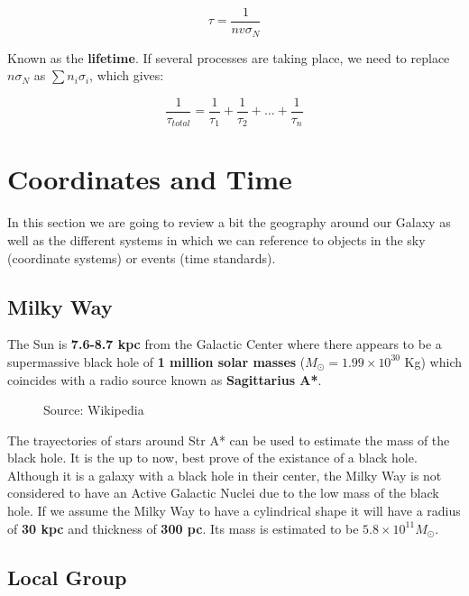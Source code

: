 \documentclass[
  letterpaper,
  DIV=11,
  numbers=noendperiod]{scrreprt}
\begin{document}
\[\tau = \frac{1}{n v\sigma_N}\]

Known as the \textbf{lifetime}. If several processes are taking place,
we need to replace \(n\sigma_N\) as \(\sum n_i\sigma_i\), which gives:

\[\frac{1}{\tau_{total}} = \frac{1}{\tau_1} + \frac{1}{\tau_2} + ... + \frac{1}{\tau_n}\]

\section*{Coordinates and Time}\label{coordinates-and-time}


In this section we are going to review a bit the geography around our
Galaxy as well as the different systems in which we can reference to
objects in the sky (coordinate systems) or events (time standards).

\subsection*{Milky Way}\label{milky-way}

The Sun is \textbf{7.6-8.7 kpc} from the Galactic Center where there
appears to be a supermassive black hole of \textbf{1 million solar
masses} (\(M_{\odot} = 1.99\times 10^{30}\) Kg) which coincides with a
radio source known as \textbf{Sagittarius A*}.

\begin{figure}[H]

{\centering 

}

\caption{Source: Wikipedia}

\end{figure}%

The trayectories of stars around Str A* can be used to estimate the mass
of the black hole. It is the up to now, best prove of the existance of a
black hole. Although it is a galaxy with a black hole in their center,
the Milky Way is not considered to have an Active Galactic Nuclei due to
the low mass of the black hole. If we assume the Milky Way to have a
cylindrical shape it will have a radius of \textbf{30 kpc} and thickness
of \textbf{300 pc}. Its mass is estimated to be
\(5.8 \times 10^{11} M_{\odot}\).

\subsection*{Local Group}\label{local-group}
\end{document}
